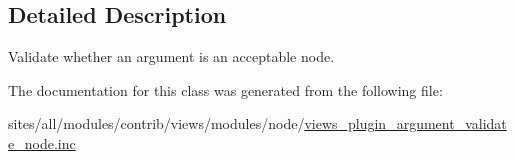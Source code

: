 \subsection{Detailed Description}
Validate whether an argument is an acceptable node. 

The documentation for this class was generated from the following file:\begin{CompactItemize}
\item 
sites/all/modules/contrib/views/modules/node/\hyperlink{views__plugin__argument__validate__node_8inc}{views\_\-plugin\_\-argument\_\-validate\_\-node.inc}\end{CompactItemize}
